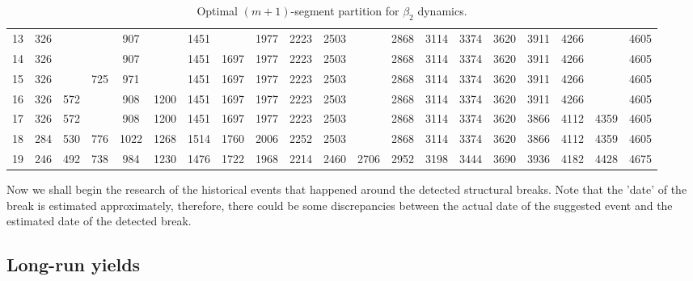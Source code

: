 \begin{landscape}
\begin{table}
\begin{tabular}{|c|ccccccccccccccccccc|}
                13 &   326 &     &     & 907  &      & 1451 &      & 1977 & 2223 & 2503 &      & 2868 & 3114 & 3374 & 3620 & 3911 & 4266 &      & 4605\\
                14 &   326 &     &     & 907  &      & 1451 & 1697 & 1977 & 2223 & 2503 &      & 2868 & 3114 & 3374 & 3620 & 3911 & 4266 &      & 4605\\
                15 &   326 &     & 725 & 971  &      & 1451 & 1697 & 1977 & 2223 & 2503 &      & 2868 & 3114 & 3374 & 3620 & 3911 & 4266 &      & 4605\\
                16 &   326 & 572 &     & 908  & 1200 & 1451 & 1697 & 1977 & 2223 & 2503 &      & 2868 & 3114 & 3374 & 3620 & 3911 & 4266 &      & 4605\\
                17 &   326 & 572 &     & 908  & 1200 & 1451 & 1697 & 1977 & 2223 & 2503 &      & 2868 & 3114 & 3374 & 3620 & 3866 & 4112 & 4359 & 4605\\
                18 &   284 & 530 & 776 & 1022 & 1268 & 1514 & 1760 & 2006 & 2252 & 2503 &      & 2868 & 3114 & 3374 & 3620 & 3866 & 4112 & 4359 & 4605\\
                19 &   246 & 492 & 738 & 984  & 1230 & 1476 & 1722 & 1968 & 2214 & 2460 & 2706 & 2952 & 3198 & 3444 & 3690 & 3936 & 4182 & 4428 & 4675\\
                \hline
            \end{tabular}
            \caption{Optimal $(m+1)$-segment partition for $\beta_2$ dynamics.}
            \label{tab:optimal_partition_beta2}
        \end{table}
    \end{landscape}

    Now we shall begin the research of the historical events that happened around the detected structural breaks. 
    Note that the 'date' of the break is estimated approximately, therefore, there could be some discrepancies between 
    the actual date of the suggested event and the estimated date of the detected break.

    \subsection{Long-run yields}
